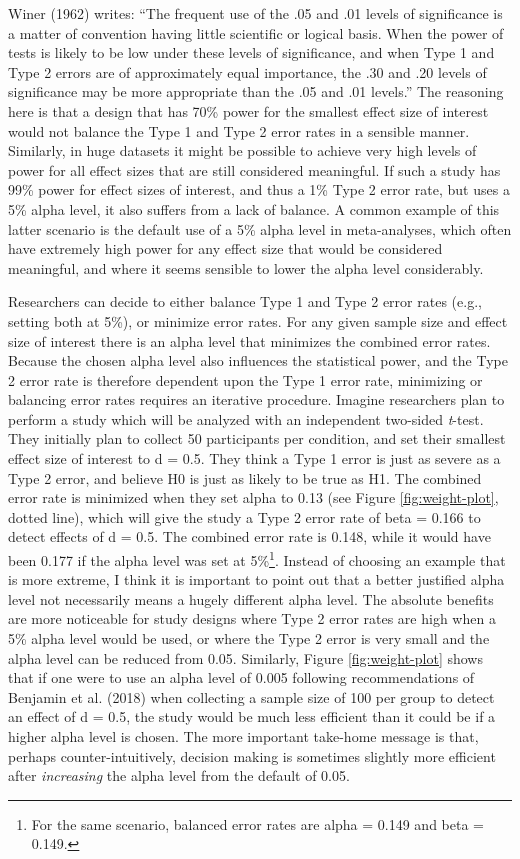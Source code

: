 \documentclass[
  english,
  ,man,floatsintext]{apa6}
\begin{document}
Winer (1962) writes: ``The frequent use of the .05 and .01 levels of significance is a matter of convention having little scientific or logical basis. When the power of tests is likely to be low under these levels of significance, and when Type 1 and Type 2 errors are of approximately equal importance, the .30 and .20 levels of significance may be more appropriate than the .05 and .01 levels.'' The reasoning here is that a design that has 70\% power for the smallest effect size of interest would not balance the Type 1 and Type 2 error rates in a sensible manner. Similarly, in huge datasets it might be possible to achieve very high levels of power for all effect sizes that are still considered meaningful. If such a study has 99\% power for effect sizes of interest, and thus a 1\% Type 2 error rate, but uses a 5\% alpha level, it also suffers from a lack of balance. A common example of this latter scenario is the default use of a 5\% alpha level in meta-analyses, which often have extremely high power for any effect size that would be considered meaningful, and where it seems sensible to lower the alpha level considerably.

Researchers can decide to either balance Type 1 and Type 2 error rates (e.g., setting both at 5\%), or minimize error rates. For any given sample size and effect size of interest there is an alpha level that minimizes the combined error rates. Because the chosen alpha level also influences the statistical power, and the Type 2 error rate is therefore dependent upon the Type 1 error rate, minimizing or balancing error rates requires an iterative procedure. Imagine researchers plan to perform a study which will be analyzed with an independent two-sided \emph{t}-test. They initially plan to collect 50 participants per condition, and set their smallest effect size of interest to d = 0.5. They think a Type 1 error is just as severe as a Type 2 error, and believe H0 is just as likely to be true as H1. The combined error rate is minimized when they set alpha to 0.13 (see Figure \ref{fig:weight-plot}, dotted line), which will give the study a Type 2 error rate of beta = 0.166 to detect effects of d = 0.5. The combined error rate is 0.148, while it would have been 0.177 if the alpha level was set at 5\%\footnote{For the same scenario, balanced error rates are alpha = 0.149 and beta = 0.149.}. Instead of choosing an example that is more extreme, I think it is important to point out that a better justified alpha level not necessarily means a hugely different alpha level. The absolute benefits are more noticeable for study designs where Type 2 error rates are high when a 5\% alpha level would be used, or where the Type 2 error is very small and the alpha level can be reduced from 0.05. Similarly, Figure \ref{fig:weight-plot} shows that if one were to use an alpha level of 0.005 following recommendations of Benjamin et al. (2018) when collecting a sample size of 100 per group to detect an effect of d = 0.5, the study would be much less efficient than it could be if a higher alpha level is chosen. The more important take-home message is that, perhaps counter-intuitively, decision making is sometimes slightly more efficient after \emph{increasing} the alpha level from the default of 0.05.
\end{document}

